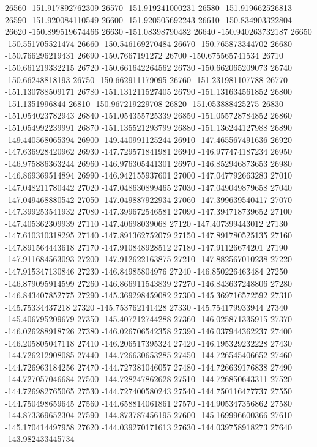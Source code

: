 {26560 -151.917892762309
26570 -151.919241000231
26580 -151.919662526813
26590 -151.920084110549
26600 -151.920505692243
26610 -150.834903322804
26620 -150.899519674466
26630 -151.08398790482
26640 -150.940263732187
26650 -150.551705521474
26660 -150.546169270484
26670 -150.765873344702
26680 -150.766296219431
26690 -150.7667191272
26700 -150.675565741534
26710 -150.661219332215
26720 -150.661642264562
26730 -150.662065209073
26740 -150.66248818193
26750 -150.662911179095
26760 -151.231981107788
26770 -151.130788509171
26780 -151.131211527405
26790 -151.131634561852
26800 -151.1351996844
26810 -150.967219229708
26820 -151.053888425275
26830 -151.054023782943
26840 -151.054355725339
26850 -151.055728784852
26860 -151.054992239991
26870 -151.135521293799
26880 -151.136244127988
26890 -149.440568065394
26900 -149.440991125244
26910 -147.465567491636
26920 -147.636928420962
26930 -147.729571841981
26940 -146.977474187234
26950 -146.975886363244
26960 -146.976305441301
26970 -146.852946873653
26980 -146.869369514894
26990 -146.942155937601
27000 -147.047792663283
27010 -147.048211780442
27020 -147.048630899465
27030 -147.049049879658
27040 -147.049468880542
27050 -147.049887922934
27060 -147.399639540417
27070 -147.399253541932
27080 -147.399672546581
27090 -147.394718739652
27100 -147.405362309939
27110 -147.40698039068
27120 -147.407399443012
27130 -147.610310318295
27140 -147.891362752079
27150 -147.891780525135
27160 -147.891564443618
27170 -147.910848928512
27180 -147.91126674201
27190 -147.911684563093
27200 -147.912622163875
27210 -147.882567010238
27220 -147.915347130846
27230 -146.84985804976
27240 -146.850226463484
27250 -146.879095914599
27260 -146.866911543839
27270 -146.843637248806
27280 -146.843407852775
27290 -145.369298459082
27300 -145.369716572592
27310 -145.75334437218
27320 -145.753762141428
27330 -145.754179933944
27340 -145.406795209679
27350 -145.407212744288
27360 -146.025871335915
27370 -146.026288918726
27380 -146.026706542358
27390 -146.037944362237
27400 -146.205805047118
27410 -146.206517395324
27420 -146.195329232228
27430 -144.726212908085
27440 -144.726630653285
27450 -144.726545406652
27460 -144.726963184256
27470 -144.727381046057
27480 -144.726639176838
27490 -144.727057046684
27500 -144.728247862628
27510 -144.726850643311
27520 -144.726982765065
27530 -144.727400580243
27540 -144.750116477737
27550 -144.750498659645
27560 -144.658814061861
27570 -144.905347356862
27580 -144.873369652304
27590 -144.873787456195
27600 -145.169996600366
27610 -145.170414497958
27620 -144.039270171613
27630 -144.039758918273
27640 -143.982433445734
}
